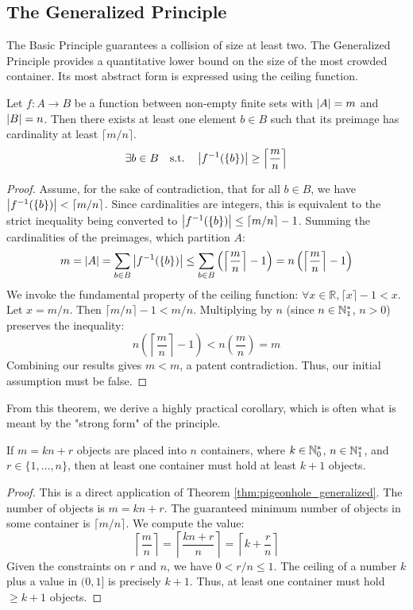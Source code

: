 \subsection{The Generalized Principle}

The Basic Principle guarantees a collision of size at least two. The Generalized Principle provides a quantitative lower bound on the size of the most crowded container. Its most abstract form is expressed using the ceiling function.

\begin{theorem}\label{thm:pigeonhole_generalized}
Let $f: A \to B$ be a function between non-empty finite sets with $\left| A \right| = m$ and $\left| B \right| = n$. Then there exists at least one element $b \in B$ such that its preimage has cardinality at least $\lceil m/n \rceil$.
$$ \exists b \in B \quad \text{s.t.} \quad \left| f^{-1}(\{b\}) \right| \ge \left\lceil \frac{m}{n} \right\rceil $$
\end{theorem}
\begin{proof}
Assume, for the sake of contradiction, that for all $b \in B$, we have $\left| f^{-1}(\{b\}) \right| < \lceil m/n \rceil$. Since cardinalities are integers, this is equivalent to the strict inequality being converted to $\left| f^{-1}(\{b\}) \right| \le \lceil m/n \rceil - 1$. Summing the cardinalities of the preimages, which partition $A$:
$$ m = \left| A \right| = \sum_{b \in B} \left| f^{-1}(\{b\}) \right| \le \sum_{b \in B} \left( \left\lceil \frac{m}{n} \right\rceil - 1 \right) = n \left( \left\lceil \frac{m}{n} \right\rceil - 1 \right) $$
We invoke the fundamental property of the ceiling function: $\forall x \in \mathbb{R}, \lceil x \rceil - 1 < x$. Let $x = m/n$. Then $\lceil m/n \rceil - 1 < m/n$. Multiplying by $n$ (since $n \in \mathbb{N}_{1}^*$, $n>0$) preserves the inequality:
$$ n \left( \left\lceil \frac{m}{n} \right\rceil - 1 \right) < n \left(\frac{m}{n}\right) = m $$
Combining our results gives $m < m$, a patent contradiction. Thus, our initial assumption must be false.
\end{proof}

From this theorem, we derive a highly practical corollary, which is often what is meant by the "strong form" of the principle.

\begin{corollary}\label{cor:pigeonhole_strong}
If $m = kn+r$ objects are placed into $n$ containers, where $k \in \mathbb{N}_{0}^*$, $n \in \mathbb{N}_{1}^*$, and $r \in \{1, \dots, n\}$, then at least one container must hold at least $k+1$ objects.
\end{corollary}
\begin{proof}
This is a direct application of Theorem \ref{thm:pigeonhole_generalized}. The number of objects is $m = kn+r$. The guaranteed minimum number of objects in some container is $\lceil m/n \rceil$. We compute the value:
$$ \left\lceil \frac{m}{n} \right\rceil = \left\lceil \frac{kn+r}{n} \right\rceil = \left\lceil k + \frac{r}{n} \right\rceil $$
Given the constraints on $r$ and $n$, we have $0 < r/n \le 1$. The ceiling of a number $k$ plus a value in $(0, 1]$ is precisely $k+1$. Thus, at least one container must hold $\ge k+1$ objects.
\end{proof}

